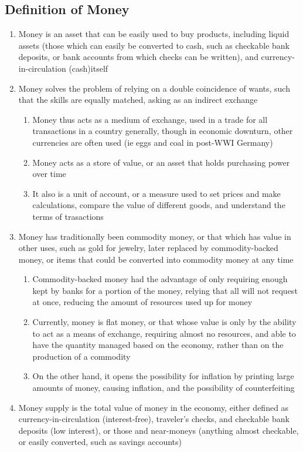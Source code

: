 \documentclass[11 pt, twoside]{article}
\begin{document}
\subsection{Definition of Money}
\begin{enumerate}
\item Money is an asset that can be easily used to buy products, including liquid assets (those which can easily be converted to cash, such as checkable bank deposits, or bank accounts from which checks can be written), and currency-in-circulation (cash)itself
\item Money solves the problem of relying on a double coincidence of wants, such that the skills are equally matched, asking as an indirect exchange
\begin{enumerate}
\item Money thus acts as a medium of exchange, used in a trade for all transactions in a country generally, though in economic downturn, other currencies are often used (ie eggs and coal in post-WWI Germany)
\item Money acts as a store of value, or an asset that holds purchasing power over time
\item It also is a unit of account, or a measure used to set prices and make calculations, compare the value of different goods, and understand the terms of trasactions
\end{enumerate}
\item Money has traditionally been commodity money, or that which has value in other uses, such as gold for jewelry, later replaced by commodity-backed money, or items that could be converted into commodity money at any time
\begin{enumerate}
\item Commodity-backed money had the advantage of only requiring enough kept by banks for a portion of the money, relying that all will not request at once, reducing the amount of resources used up for money
\item Currently, money is flat money, or that whose value is only by the ability to act as a means of exchange, requiring almost no resources, and able to have the quantity managed based on the economy, rather than on the production of a commodity
\item On the other hand, it opens the possibility for inflation by printing large amounts of money, causing inflation, and the possibility of counterfeiting
\end{enumerate}
\item Money supply is the total value of money in the economy, either defined as currency-in-circulation (interest-free), traveler's checks, and checkable bank deposits (low interest), or those and near-moneys (anything almost checkable, or easily converted, such as savings accounts)

\end{enumerate}
\end{document}
